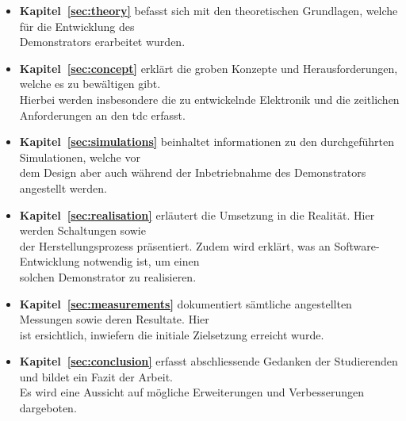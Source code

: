 \begin{itemize}
    \item \textbf{Kapitel~\ref{sec:theory}} befasst sich mit den theoretischen Grundlagen, welche für die Entwicklung des \\
          Demonstrators erarbeitet wurden.

    \item \textbf{Kapitel~\ref{sec:concept}} erklärt die groben Konzepte und Herausforderungen, welche es zu bewältigen gibt. \\
          Hierbei werden insbesondere die zu entwickelnde Elektronik und die zeitlichen Anforderungen an den \acrshort{tdc} erfasst.

    \item \textbf{Kapitel~\ref{sec:simulations}} beinhaltet informationen zu den durchgeführten Simulationen, welche vor \\
          dem Design aber auch während der Inbetriebnahme des Demonstrators angestellt werden.

    \item \textbf{Kapitel~\ref{sec:realisation}} erläutert die Umsetzung in die Realität. Hier werden Schaltungen sowie \\
          der Herstellungsprozess präsentiert. Zudem wird erklärt, was an Software-Entwicklung notwendig ist, um einen \\
          solchen Demonstrator zu realisieren.

    \item \textbf{Kapitel~\ref{sec:measurements}} dokumentiert sämtliche angestellten Messungen sowie deren Resultate. Hier \\
          ist ersichtlich, inwiefern die initiale Zielsetzung erreicht wurde.

    \item \textbf{Kapitel~\ref{sec:conclusion}} erfasst abschliessende Gedanken der Studierenden und bildet ein Fazit der Arbeit. \\
          Es wird eine Aussicht auf mögliche Erweiterungen und Verbesserungen dargeboten.
\end{itemize}
